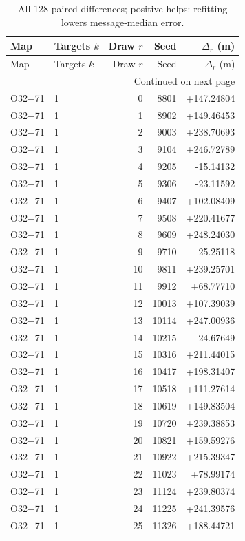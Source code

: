 \documentclass[journal,onecolumn,10pt]{IEEEtran}
\begin{document}
\begin{longtable}{llrrr}
\caption{All 128 paired differences; positive helps: refitting lowers message-median error.}\label{tab:s17all}\\
\toprule Map&Targets $k$&Draw $r$&Seed&$\Delta_r$ (m)\\\midrule\endfirsthead
\toprule Map&Targets $k$&Draw $r$&Seed&$\Delta_r$ (m)\\\midrule\endhead
\midrule\multicolumn{5}{r}{Continued on next page}\\\endfoot
\bottomrule\endlastfoot
O32$-$71 & 1 & 0 & 8801 & +147.24804 \\
O32$-$71 & 1 & 1 & 8902 & +149.46453 \\
O32$-$71 & 1 & 2 & 9003 & +238.70693 \\
O32$-$71 & 1 & 3 & 9104 & +246.72789 \\
O32$-$71 & 1 & 4 & 9205 & -15.14132 \\
O32$-$71 & 1 & 5 & 9306 & -23.11592 \\
O32$-$71 & 1 & 6 & 9407 & +102.08409 \\
O32$-$71 & 1 & 7 & 9508 & +220.41677 \\
O32$-$71 & 1 & 8 & 9609 & +248.24030 \\
O32$-$71 & 1 & 9 & 9710 & -25.25118 \\
O32$-$71 & 1 & 10 & 9811 & +239.25701 \\
O32$-$71 & 1 & 11 & 9912 & +68.77710 \\
O32$-$71 & 1 & 12 & 10013 & +107.39039 \\
O32$-$71 & 1 & 13 & 10114 & +247.00936 \\
O32$-$71 & 1 & 14 & 10215 & -24.67649 \\
O32$-$71 & 1 & 15 & 10316 & +211.44015 \\
O32$-$71 & 1 & 16 & 10417 & +198.31407 \\
O32$-$71 & 1 & 17 & 10518 & +111.27614 \\
O32$-$71 & 1 & 18 & 10619 & +149.83504 \\
O32$-$71 & 1 & 19 & 10720 & +239.38853 \\
O32$-$71 & 1 & 20 & 10821 & +159.59276 \\
O32$-$71 & 1 & 21 & 10922 & +215.39347 \\
O32$-$71 & 1 & 22 & 11023 & +78.99174 \\
O32$-$71 & 1 & 23 & 11124 & +239.80374 \\
O32$-$71 & 1 & 24 & 11225 & +241.39576 \\
O32$-$71 & 1 & 25 & 11326 & +188.44721 \\

\end{longtable}
\end{document}
